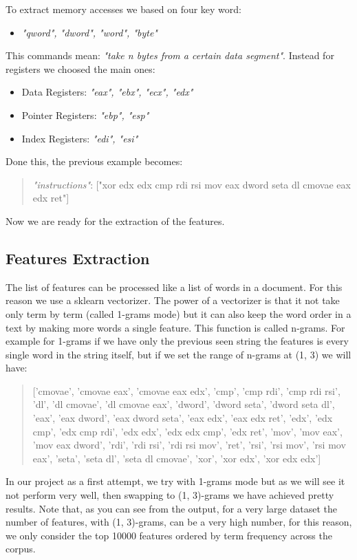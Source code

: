 \documentclass[12pt]{article}
\begin{document}
To extract memory accesses we based on four key word:
\begin{itemize}
\item {\em "qword", "dword", "word", "byte"}
\end{itemize}
This commands mean: {\em "take n bytes from a certain data segment"}.
Instead for registers we choosed the main ones:
\begin{itemize}
\item Data Registers: {\em "eax", "ebx", "ecx", "edx"}
\item Pointer Registers: {\em "ebp", "esp"}
\item Index Registers: {\em "edi", "esi"}
\end{itemize}

Done this, the previous example becomes:
\begin{quote}
{\em "instructions"}: ["xor edx edx cmp rdi rsi mov eax dword seta dl cmovae eax edx ret"]
\end{quote}

Now we are ready for the extraction of the features.

\subsection{Features Extraction}
The list of features can be processed like a list of words in a document. For this reason we use a sklearn vectorizer. The power of a vectorizer is that it not take only term by term (called 1-grams mode) but it can also keep the word order in a text by making more words a single feature. This function is called n-grams. For example for 1-grams if we have only the previous seen string the features is every single word in the string itself, but if we set the range of n-grams at (1, 3) we will have:
\begin{quote}
['cmovae', 'cmovae eax', 'cmovae eax edx', 'cmp', 'cmp rdi', 'cmp rdi rsi', 'dl', 'dl cmovae', 'dl cmovae eax', 'dword', 'dword seta', 'dword seta dl', 'eax', 'eax dword', 'eax dword seta', 'eax edx', 'eax edx ret', 'edx', 'edx cmp', 'edx cmp rdi', 'edx edx', 'edx edx cmp', 'edx ret', 'mov', 'mov eax', 'mov eax dword', 'rdi', 'rdi rsi', 'rdi rsi mov', 'ret', 'rsi', 'rsi mov', 'rsi mov eax', 'seta', 'seta dl', 'seta dl cmovae', 'xor', 'xor edx', 'xor edx edx']
\end{quote}

In our project as a first attempt, we try with 1-grams mode but as we will see it not perform very well, then swapping to (1, 3)-grams we have achieved pretty results. Note that, as you can see from the output, for a very large dataset the number of features, with (1, 3)-grams, can be a very high number, for this reason, we only consider the top 10000 features ordered by term frequency across the corpus.
\end{document}

